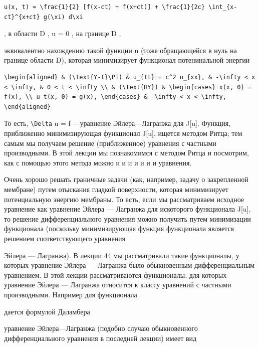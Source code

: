 \documentclass[
  ukrainian,
]{article}
\begin{document}
\begin{verbatim}
u(x, t) = \frac{1}{2} [f(x-ct) + f(x+ct)] + \frac{1}{2c} \int_{x-ct}^{x+ct} g(\xi) d\xi
\end{verbatim}

, в области D , u = 0 , на границе D ,

эквивалентно нахождению такой функции u (тоже обращающейся в нуль на
границе области D), которая минимизирует функционал потенинальной
энергии

\begin{verbatim}
\begin{aligned} & (\text{Y-I}\Pi) & u_{tt} = c^2 u_{xx}, & -\infty < x < \infty, & 0 < t < \infty \\ & (\text{HY}) & \begin{cases} x(x, 0) = f(x), \\ u_t(x, 0) = g(x), \end{cases} & -\infty < x < \infty, \end{aligned}
\end{verbatim}

То есть, \texttt{\textbackslash{}Delta} u = f ---уравнение
Эйлера---Лагранжа для J{[}u{]}. Функция, приближенно минимизирующая
функционал J{[}u{]}, ищется методом Ритца; тем самым мы получаем решение
(приближениое) уравнения с частными производными. В этой лекции мы
познакомимся с методом Ритца и посмотрим, как с помощью этого метода
можно и и и и и и и уравнения.

Очень хорошо решать граничные задачи (как, например, задачу о
закрепленной мембране) путем отыскания гладкой поверхности, которая
минимизирует потенциальную энергию мембраны. То есть, если мы
рассматриваем исходное уравнение как уравнение Эйлера --- Лагранжа для
искоторого функционала J{[}u{]}, то решение дифференциального уравнения
можно получить путем минимизации функционала (поскольку минимизирующая
функция функционала является решением соответствующего уравнения

Эйлера --- Лагранжа). В лекции 44 мы рассматривали такие функционалы, у
которых уравнение Эйлера --- Лагранжа было обыкновенным дифференциальным
уравнением. В этой лекции рассматриваются функционалы, для которых
уравнение Эйлера --- Лагранжа относится к классу уравнений с частными
производными. Например для функционала

дается формулой Даламбера

уравнение Эйлера---Лагранжа (подобно случаю обыкновенного
дифференциального уравнения в последней лекции) имеет вид
\end{document}
